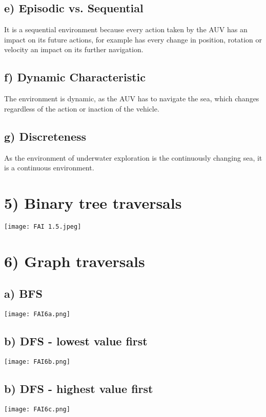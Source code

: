 \documentclass[12pt]{scrartcl}
\begin{document}
    \subsection*{e) Episodic vs. Sequential}
        It is a sequential environment because every action taken by the AUV has an impact on its future actions, 
        for example has every change in position, rotation or velocity an impact on its further navigation.

    \subsection*{f) Dynamic Characteristic}
        The environment is dynamic, as the AUV has to navigate the sea, which changes regardless of the action or inaction of the vehicle.

    \subsection*{g) Discreteness}
        As the environment of underwater exploration is the continuously changing sea, it is a continuous environment.

\section*{5) Binary tree traversals}
    \texttt{[image: FAI 1.5.jpeg]}

\section*{6) Graph traversals}
    \subsection*{a) BFS}
    \texttt{[image: FAI6a.png]}

    \subsection*{b) DFS - lowest value first}
    \texttt{[image: FAI6b.png]}

    \subsection*{b) DFS - highest value first}
    \texttt{[image: FAI6c.png]}
\end{document}
